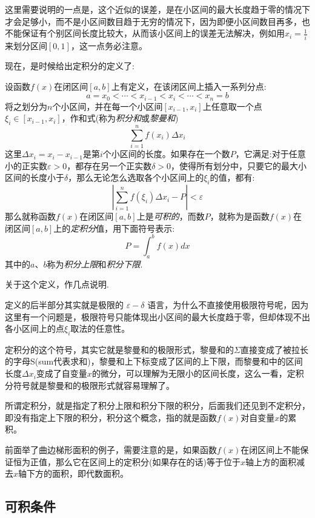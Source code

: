 这里需要说明的一点是，这个近似的误差，是在小区间的最大长度趋于零的情况下才会足够小，而不是小区间数目趋于无穷的情况下，因为即便小区间数目再多，也不能保证有个别区间长度比较大，从而该小区间上的误差无法解决，例如用$x_i = \frac{1}{i}$来划分区间$[0,1]$，这一点务必注意。

现在，是时候给出定积分的定义了:
\begin{definition}[积分和与定积分]
  设函数$f(x)$在闭区间$[a,b]$上有定义，在该闭区间上插入一系列分点:
  \[ a = x_0 < \cdots < x_{i-1} < x_i < \cdots < x_n = b \]
  将之划分为$n$个小区间，并在每一个小区间$[x_{i-1},x_i]$上任意取一个点$\xi_i\in [x_{i-1},x_i]$，作和式(称为\emph{积分和}或\emph{黎曼和})
  \[ \sum_{i=1}^n f(x_i) \Delta x_i \]
  这里$\Delta x_i = x_i-x_{i-1}$是第$i$个小区间的长度。如果存在一个数$P$，它满足:对于任意小的正实数$\varepsilon >0$，都存在另一个正实数$\delta >0$，使得所有划分中，只要它的最大小区间的长度小于$\delta$，那么无论怎么选取各个小区间上的$\xi_i$的值，都有:
  \[ \left| \sum_{i=1}^n f(\xi_i) \Delta x_i - P \right| < \varepsilon \]
  那么就称函数$f(x)$在闭区间$[a,b]$上是\emph{可积的}，而数$P$，就称为是函数$f(x)$在闭区间$[a,b]$上的\emph{定积分}值，用下面符号表示:
  \[ P = \int_a^b f(x)dx \]
  其中的$a$、$b$称为\emph{积分上限}和\emph{积分下限}.
\end{definition}

关于这个定义，作几点说明.

定义的后半部分其实就是极限的 $\varepsilon - \delta$ 语言，为什么不直接使用极限符号呢，因为这里有一个问题是，极限符号只能体现出小区间的最大长度趋于零，但却体现不出各小区间上的点$\xi_i$取法的任意性。

定积分的这个符号，其实它就是黎曼和的极限形式，黎曼和的$\Sigma$直接变成了被拉长的字母S(sum代表求和)，黎曼和上下标变成了区间的上下限，而黎曼和中的区间长度$\Delta x_i$变成了自变量$x$的微分，可以理解为无限小的区间长度，这么一看，定积分符号就是黎曼和的极限形式就容易理解了。

所谓定积分，就是指定了积分上限和积分下限的积分，后面我们还见到不定积分，即没有指定上下限的积分，积分这个概念，指的就是函数$f(x)$对自变量$x$的累积。

前面举了曲边梯形面积的例子，需要注意的是，如果函数$f(x)$在闭区间上不能保证恒为正值，那么它在区间上的定积分(如果存在的话)等于位于$x$轴上方的面积减去$x$轴下方的面积，即代数面积。

\subsection{可积条件}
\label{sec:integrable-function}


